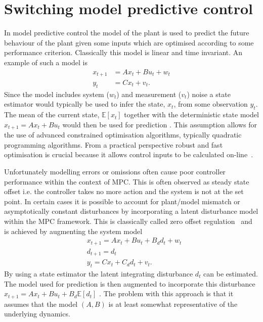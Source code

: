 \section{Switching model predictive control}
\label{sec_switch_mpc_lit}
In model predictive control the model of the plant is used to predict the future behaviour of the plant given some inputs which are optimised according to some performance criterion. Classically this model is linear and time invariant. An example of such a model is 
\begin{equation}
\begin{aligned}
x_{t+1} &= Ax_t + Bu_t + w_t \\
y_t &= Cx_t + v_t.
\end{aligned}
\label{eq_mpc_nodisturbance_obs}
\end{equation} 
Since the model includes system ($w_t$) and measurement ($v_t$) noise a state estimator would typically be used to infer the state, $x_t$, from some observation $y_t$. The mean of the current state, $\mathbb{E}[x_t]$ together with the deterministic state model $x_{t+1} = Ax_t + Bu_t$ would then be used for prediction \cite{raw}. This assumption allows for the use of advanced constrained optimisation algorithms, typically quadratic programming algorithms. From a practical perspective robust and fast optimisation is crucial because it allows control inputs to be calculated on-line~\cite{mac}.

Unfortunately modelling errors or omissions often cause poor controller performance within the context of MPC. This is often observed as steady state offset i.e. the controller takes no more action and the system is not at the set point. In certain cases it is possible to account for plant/model mismatch or asymptotically constant disturbances by incorporating a latent disturbance model within the MPC framework. This is classically called zero offset regulation~\cite{raw} and is achieved by augmenting the system model
\begin{equation}
\begin{aligned}
&x_{t+1} = Ax_t + Bu_t + B_d d_t + w_t \\
&d_{t+1} = d_t\\
&y_t = Cx_t + C_d d_t + v_t.
\end{aligned}
\label{eq_mpc_disturbance_obs}
\end{equation}
By using a state estimator the latent integrating disturbance $d_t$ can be estimated. The model used for prediction is then augmented to incorporate this disturbance $x_{t+1} = Ax_t + Bu_t + B_d\mathbb{E}[d_t]$ \cite{lee}. The problem with this approach is that it assumes that the model $(A, B)$ is at least somewhat representative of the underlying dynamics.


